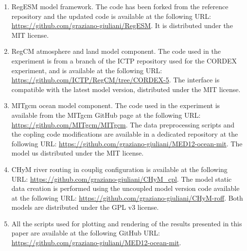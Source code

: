 \documentclass[journal abbreviation, manuscript]{copernicus}
\begin{document}
{\begin{enumerate}
    \item RegESM model framework. The code has been forked from the reference
        repository and the updated code is available at the following URL:
        \url{https://github.com/graziano-giuliani/RegESM}. It is distributed
        under the MIT license.
    \item RegCM atmosphere and land model component. The code used in the
        experiment is from a branch of the ICTP repository used for the
        CORDEX experiment, and is available at the following URL:
        \url{https://github.com/ICTP/RegCM/tree/CORDEX-5}. The interface is
        compatible with the latest model version, distributed under the MIT
        license.
    \item MITgcm ocean model component. The code used in the experiment is
        available from the MITgcm GitHub page at the following URL:
        \url{https://github.com/MITgcm/MITgcm}. The data preprocessing
        scripts and the copling code modifications are available in a
        dedicated repository at the following URL:
        \url{https://github.com/graziano-giuliani/MED12-ocean-mit}.
        The model us distributed under the MIT license.
    \item CHyM river routing in couplig configuration is available at the
        following URL: \url{https://github.com/graziano-giuliani/CHyM\_cpl}.
        The model static data creation is performed using the uncoupled
        model version code available at the following URL:
        \url{https://github.com/graziano-giuliani/CHyM-roff}. Both models
        are distributed under the GPL v3 license.
    \item All the scripts used for plotting and rendering of the results
        presented in this paper are available at the following GitHub URL:
        \url{https://github.com/graziano-giuliani/MED12-ocean-mit}.
\end{enumerate}
}

\end{document}
